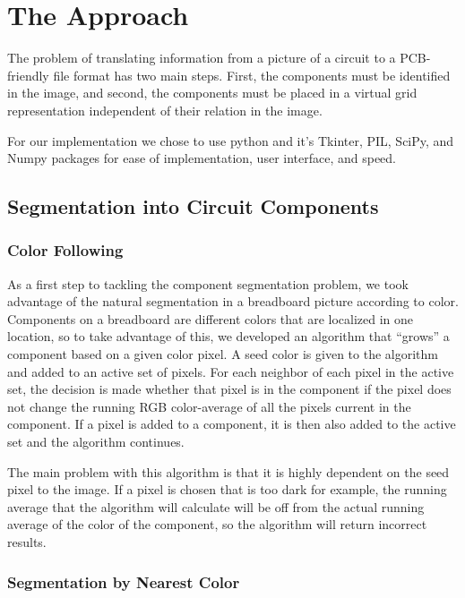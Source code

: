 \documentclass[10pt,twocolumn,letterpaper]{article}
\begin{document}
\section{The Approach}

The problem of translating information from a picture of a circuit to a
PCB-friendly file format has two main steps. First, the components must be
identified in the image, and second, the components must be placed in a virtual
grid representation independent of their relation in the image. 

For our implementation we chose to use python and it's Tkinter, PIL, SciPy, and
Numpy packages for ease of implementation, user interface, and speed. 

\subsection{Segmentation into Circuit Components}

\subsubsection{Color Following}

As a first step to tackling the component segmentation problem, we took
advantage of the natural segmentation in a breadboard picture according to
color. Components on a breadboard are different colors that are localized in
one location, so to take advantage of this, we developed an algorithm that
``grows'' a component based on a given color pixel. A seed color is given to
the algorithm and added to an active set of pixels. For each neighbor of each
pixel in the active set, the decision is made whether that pixel is in the
component if the pixel does not change the running RGB color-average of all the
pixels current in the component. If a pixel is added to a component, it is then
also added to the active set and the algorithm continues.     

The main problem with this algorithm is that it is highly dependent on the seed
pixel to the image. If a pixel is chosen that is too dark for example, the
running average that the algorithm will calculate will be off from the actual
running average of the color of the component, so the algorithm will return
incorrect results.   

\subsubsection{Segmentation by Nearest Color}
\end{document}
